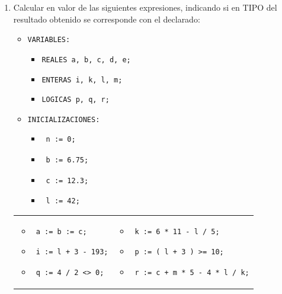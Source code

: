 \documentclass[a4paper,10pt]{article}
\begin{document}
\begin{enumerate}
\item Calcular en valor de las siguientes expresiones, indicando si en TIPO del resultado obtenido se corresponde con el declarado:
    \begin{itemize}
        \item[]	\verb=VARIABLES:=
            \begin{itemize}
                \item[]	\verb=REALES a, b, c, d, e;=
                \item[] \verb=ENTERAS i, k, l, m;=
                \item[] \verb=LOGICAS p, q, r;=
            \end{itemize}
        \item[] \verb=INICIALIZACIONES:=
            \begin{itemize}
                \item[] \begin{verbatim} n := 0;\end{verbatim}
                \item[] \begin{verbatim} b := 6.75;\end{verbatim}
                \item[] \begin{verbatim} c := 12.3;\end{verbatim}
                \item[] \begin{verbatim} l := 42;\end{verbatim}
            \end{itemize}
    \end{itemize}
\begin{tabular}{p{} p{}}
    \begin{itemize}
        \item[a-] \begin{verbatim} a := b := c;\end{verbatim}
        \item[c-] \begin{verbatim} i := l + 3 - 193;\end{verbatim}
        \item[e-] \begin{verbatim} q := 4 / 2 <> 0;\end{verbatim}
    \end{itemize}
&
    \begin{itemize}
        \item[b-] \begin{verbatim} k := 6 * 11 - l / 5;\end{verbatim}
        \item[d-] \begin{verbatim} p := ( l + 3 ) >= 10;\end{verbatim}
         \item[f-] \begin{verbatim} r := c + m * 5 - 4 * l / k;\end{verbatim}
    \end{itemize}
\\
\end{tabular}    


\end{enumerate}
\end{document}
